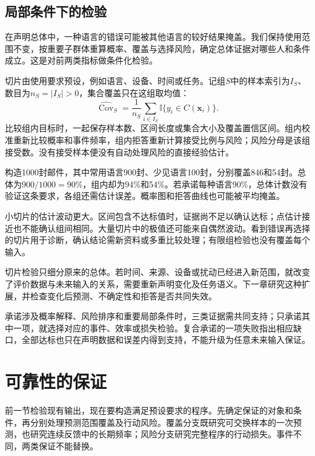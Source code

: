 \subsection{局部条件下的检验}
\label{sec:reliability-conditional-evaluation}

在声明总体中，一种语言的错误可能被其他语言的较好结果掩盖。我们保持使用范围不变，按重要子群体重算概率、覆盖与选择风险，确定总体证据对哪些人和条件成立。这是对前两类指标做条件化检验。

切片由使用要求预设，例如语言、设备、时间或任务。记组$S$中的样本索引为$I_S$、数目为$n_S=|I_S|>0$，集合覆盖只在这组取均值：
\begin{equation}
 \widehat{\operatorname{Cov}}_S
 =\frac1{n_S}\sum_{i\in I_S}
   \mathbb I\{y_i\in C(\bm{x}_i)\}.
 \label{eq:reliability-group-coverage}
\end{equation}
比较组内目标时，一起保存样本数、区间长度或集合大小及覆盖置信区间。组内校准重新比较概率和事件频率，组内拒答重新计算接受比例与风险；风险分母是该组接受数。没有接受样本便没有自动处理风险的直接经验估计。

构造1000封邮件，其中常用语言900封、少见语言100封，分别覆盖846和54封。总体为$900/1000=90\%$，组内却为94\%和54\%。若承诺每种语言90\%，总体计数没有验证这条要求，各组还需估计误差。概率图和拒答曲线也可能被平均掩盖。

小切片的估计波动更大。区间包含不达标值时，证据尚不足以确认达标；点估计接近也不能确认组间相同。大量切片中的极值还可能来自偶然波动。看到错误再选择的切片用于诊断，确认结论需新资料或多重比较处理；有限组检验也没有覆盖每个输入。

切片检验只细分原来的总体。若时间、来源、设备或扰动已经进入新范围，就改变了评价数据与未来输入的关系，需要重新声明变化及任务语义。下一章研究这种扩展，并检查变化后预测、不确定性和拒答是否共同失效。

承诺涉及概率解释、风险排序和重要局部条件时，三类证据需共同支持；只承诺其中一项，就选择对应的事件、效率或损失检验。复合承诺的一项失败指出相应缺口，全部达标也只在声明数据和误差内得到支持，不能升级为任意未来输入保证。

\section{可靠性的保证}
\label{sec:reliability-guarantee}

前一节检验现有输出，现在要构造满足预设要求的程序。先确定保证的对象和条件，再分别处理预测范围覆盖及行动风险。覆盖分支既研究可交换样本的一次预测，也研究连续反馈中的长期频率；风险分支研究完整程序的行动损失。事件不同，两类保证不能替换。

